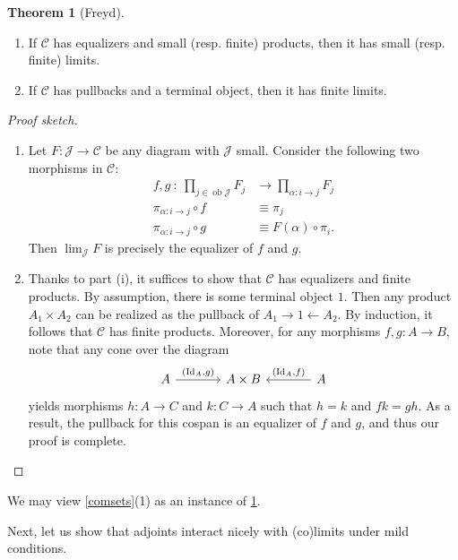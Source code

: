 \documentclass[10pt,letterpaper,cm]{nupset}
\theoremstyle{definition}
\theoremstyle{theorem}
\newtheorem{theorem}[definition]{Theorem}
\theoremstyle{remark}
\newcommand{\1}{\mathbf{1}}
\renewcommand{\c}{\mathscr{C}}
\renewcommand{\j}{\mathscr{J}}
\newcommand{\0}{\vec 0}
\DeclareMathOperator{\id}{Id}
\DeclareMathOperator{\ob}{ob}
\begin{document}
\smallskip

\begin{theorem}[Freyd]\label{Freyd} $ $
\begin{enumerate}[label=(\roman*)]
\item If $\c$ has equalizers and small (resp. finite) products, then it has small (resp. finite) limits.
\item If $\c$ has pullbacks and a terminal object, then it has finite limits.
\end{enumerate}
\end{theorem}
\begin{proof}[Proof sketch] $ $
\begin{enumerate}
\item Let $F : \j \to \c$ be any diagram with $\j$ small. Consider the following two morphisms in $\c$:
\begin{align*}
f, g \ :  \ \prod_{j\in \ob{\j}}F_j & \longrightarrow \prod_{\alpha : i \to j}F_j
\\ \pi_{\alpha : i \to j} \circ f & \equiv \pi_j
\\ \pi_{\alpha : i \to j} \circ g & \equiv F(\alpha) \circ \pi_i.
\end{align*}
Then $\lim_{\j}{F}$ is precisely the equalizer of $f$ and $g$.
\item Thanks to part (i), it suffices to show that $\c$ has equalizers and finite products. By assumption, there is some terminal object $1$. Then any product $A_1 \times A_2$ can be realized as the pullback of $A_1 \rightarrow 1 \leftarrow A_2$. By induction, it follows that $\c$ has finite products. Moreover, for any morphisms $f,g : A \to B$, note that any cone over the diagram 
\[
\begin{tikzcd}[column sep=large]
A \arrow[r, "{\left(\id_A, g\right)}"] & A\times B & A \arrow[l, "{\left(\id_A, f\right)}"']
\end{tikzcd}
\] yields morphisms $h: A \to C$ and $k : C \to A$ such that $h=k$ and $fk = gh$. As a result, the pullback for this cospan is an equalizer of $f$ and $g$, and thus our proof is complete.
\end{enumerate}
\end{proof}

We may view \cref{comsets}(1) as an instance of \cref{Freyd}.

\medskip

Next, let us show that adjoints interact nicely with (co)limits under mild conditions.
\end{document}
